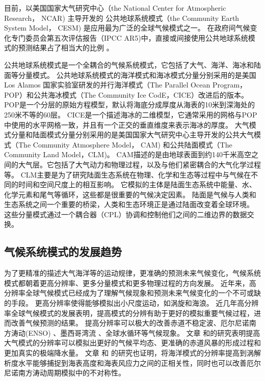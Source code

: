  
目前，以美国国家大气研究中心（the National Center for Atmospheric Research， NCAR) 主导开发的
公共地球系统模式（the Community Earth System Model， CESM) 是应用最为广泛的全球气候模式之一\cite{hurrell2013community}。
在政府间气候变化专门委员会第五次评估报告（IPCC AR5)中，直接或间接使用公共地球系统模式的预测结果占了相当大的比例 \cite{stocker2013ipcc}。
 

公共地球系统模式是一个全耦合的气候系统模式，它包括了大气、海洋、海冰和陆面等分量模式。
公共地球系统模式的海洋模式和海冰模式分量分别采用的是美国Los Alamos 国家实验室研发的并行海洋模式（The Parallel Ocean Program，POP）和公共海冰模式（The Community Ice CodE，CICE）改进后的版本。
POP是一个分层的原始方程模型，默认将海底分成厚度从海表的10米到深海处的250米不等的60层。
CICE是一个描述海冰的二维模型，它通常采用的网格与POP中使用的水平网格一致，并且有一个正交的垂直维度来表示海冰的厚度。 
大气模式分量和陆面模式分量分别采用的是美国国家大气研究中心主导开发的公共大气模式（The Community Atmosphere Model， CAM) 和公共陆面模式（The Community Land Model，CLM)。 
CAM描述的是由地球表面到约140千米高空之间的大气层。它包括了大气动力和物理过程，以及与他们紧密耦合的大气化学过程等。
CLM主要是为了研究陆面生态系统在物理、化学和生态等过程中与气候在不同的时间和空间尺度上的相互影响。
它模拟的主体是陆面生态系统中能量、水、化学元素和尾气等循环，这些都是很重要的气候决定因素。
陆面是气候与人类和生态系统之间一个重要的桥梁，人类和生态环境正是通过陆面改变着全球环境。
这些分量模式通过一个耦合器（CPL）协调和控制他们之间的二维边界的数据交换。

 

\subsection{气候系统模式的发展趋势}

为了更精准的描述大气海洋等的运动规律，更准确的预测未来气候变化，气候系统模式都朝着更高分辨率、更多分量模式和更多物理过程的方向发展。
近年来，高分辨率全球气候模式已经成为了理解气候现象和预测未来气候变化的一个不可或缺的手段。
更高分辨率使得能够模拟出小尺度运动，如涡旋和海浪。 
近几年高分辨率全球气候模式的发展表明，提高模式的分辨有助于更好的模拟重要气候过程，进而改善气候预测的结果。
提高分辨率可以极大的改善赤道不稳定波\citep{roberts2009impact}、厄尔尼诺南方涛动(ENSO) \citep{shaffrey2009uk}、墨西哥湾流\citep{chassignet2008gulf, kuwano2010precipitation} 、全球水循环\citep{demory2014role}等气候现象。
文章 和的研究表明提高大气模式的分辨率可以模拟出更好的气候平均态、更准确的赤道风暴的形成过程和更加真实的极端降水量。
文章 和 的研究也证明，将海洋模式的分辨率提高到涡解析度水平能够捕捉到海表高度和海表风应力之间的正相关性，同时也可以改善厄尔尼诺南方涛动周期模拟中的不对称性。



